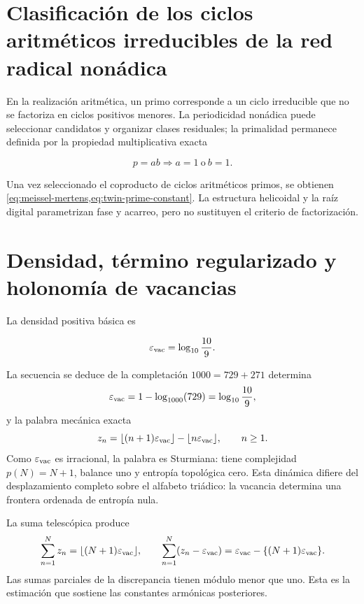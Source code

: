 \section{Clasificación de los ciclos aritméticos irreducibles de la red radical nonádica}

En la realizaci\'on aritm\'etica, un primo corresponde a un ciclo
irreducible que no se factoriza en ciclos positivos menores. La periodicidad
non\'adica puede seleccionar candidatos y organizar clases residuales; la
primalidad permanece definida por la propiedad multiplicativa exacta

\[
p=ab\Longrightarrow a=1\ \text{o}\ b=1.
\]

Una vez seleccionado el coproducto de ciclos aritm\'eticos primos, se
obtienen \cref{eq:meissel-mertens,eq:twin-prime-constant}. La estructura
helicoidal y la ra\'iz digital parametrizan fase y acarreo, pero no sustituyen
el criterio de factorizaci\'on.

\section{Densidad, t\'ermino regularizado y holonom\'ia de vacancias}

La densidad positiva b\'asica es

\begin{equation}
\varepsilon_{\rm vac}=\log_{10}\frac{10}{9}.
\label{eq:vacancy-density}
\end{equation}

La secuencia se deduce de la completaci\'on
\(1000=729+271\) determina
\begin{equation}
\varepsilon_{\rm vac}
=1-\log_{1000}(729)
=\log_{10}\frac{10}{9},
\label{eq:vacancy-density-two-forms}
\end{equation}
y la palabra mec\'anica exacta
\begin{equation}
z_n=\lfloor(n+1)\varepsilon_{\rm vac}\rfloor
-\lfloor n\varepsilon_{\rm vac}\rfloor,
\qquad n\ge1.
\label{eq:vacancy-mechanical-word}
\end{equation}
Como \(\varepsilon_{\rm vac}\) es irracional, la palabra es Sturmiana:
tiene complejidad \(p(N)=N+1\), balance uno y entrop\'ia topol\'ogica cero.
Esta din\'amica difiere del desplazamiento completo sobre el alfabeto
tri\'adico: la vacancia determina una frontera ordenada de entrop\'ia nula.

La suma telesc\'opica produce
\begin{equation}
\sum_{n=1}^{N}z_n
=\lfloor(N+1)\varepsilon_{\rm vac}\rfloor,
\qquad
\sum_{n=1}^{N}(z_n-\varepsilon_{\rm vac})
=\varepsilon_{\rm vac}
-\{(N+1)\varepsilon_{\rm vac}\}.
\label{eq:vacancy-discrepancy}
\end{equation}
Las sumas parciales de la discrepancia tienen m\'odulo menor que uno. Esta
es la estimaci\'on que sostiene las constantes arm\'onicas posteriores.


